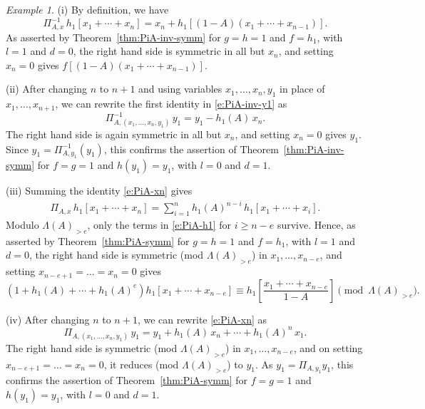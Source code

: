 \documentclass[12pt]{amsart}
\theoremstyle{definition}
\theoremstyle{remark}
\newtheorem{example}[thm]{Example}
\begin{document}
\begin{example}\label{ex:PiA-limits}
(i) By definition, we have
\begin{equation}\label{e:PiA-inv-h1}
\Pi _{A,x}^{-1}\, h_{1}[x_{1}+\cdots +x_{n}] =
x_{n}+h_{1}[(1-A)(x_{1}+\cdots +x_{n-1})].
\end{equation}
As asserted by Theorem~\ref{thm:PiA-inv-symm} for $g=h=1$ and
$f=h_{1}$, with $l=1$ and $d=0$, the right hand side is symmetric in
all but $x_{n}$, and setting $x_{n} = 0$ gives $f[(1-A)(x_{1}+\cdots
+x_{n-1})]$.

(ii) After changing $n$ to $n+1$ and using variables $x_1, \dots, x_n,
y_1$ in place of $x_1,\dots, x_{n+1}$, we can rewrite the first
identity in \eqref{e:PiA-inv-y1} as
\begin{equation}
\Pi _{A,(x_{1},\ldots,x_{n},y_{1})}^{-1}\, y_{1} = y_{1} - h_{1}(A)\,
x_{n}.
\end{equation}
The right hand side is again symmetric in all but $x_{n}$, and setting
$x_{n} = 0$ gives $y_{1}$. Since $y_1=\Pi^{-1}_{A,y_1}(y_1)$, this
confirms the assertion of Theorem~\ref{thm:PiA-inv-symm} for $f = g =
1$ and $h(y_{1})=y_{1}$, with $l=0$ and $d=1$.

(iii) Summing the identity \eqref{e:PiA-xn} gives
\begin{gather}
\label{e:PiA-h1}
\Pi _{A,x}\, h_{1}[x_{1}+\cdots +x_{n}] = \sum _{i=1}^{n}
h_{1}(A)^{n-i}\, h_{1}[x_{1}+\cdots +x_{i}].
\end{gather}
Modulo $\Lambda (A)_{>e}$, only the terms in \eqref{e:PiA-h1} for
$i\geq n-e$ survive.  Hence, as asserted by Theorem~\ref{thm:PiA-symm}
for $g=h=1$ and $f=h_{1}$, with $l=1$ and $d=0$, the right hand side
is symmetric (mod $\Lambda (A)_{>e}$) in $x_{1},\ldots,x_{n-e}$, and
setting $x_{n-e+1} = \ldots =x_{n} = 0$ gives
\begin{equation}\label{e:PiA-h1-reduced}
(1+h_{1}(A)+\cdots +h_{1}(A)^{e}) h_{1}[x_{1}+\cdots +x_{n-e}] \equiv
h_{1}\! \left[\frac{x_{1}+\cdots +x_{n-e}}{1-A}\right] \pmod{\Lambda
(A)_{>e}}.
\end{equation}

(iv) After changing $n$ to $n+1$, we can rewrite \eqref{e:PiA-xn} as
\begin{equation}\label{e:PiA-y1}
\Pi _{A,(x_{1},\ldots,x_{n},y_{1})}\, y_{1} = y_{1} + h_{1}(A)\, x_{n}
+\cdots +h_{1}(A)^{n}\, x_{1}.
\end{equation}
The right hand side is
symmetric (mod $\Lambda (A)_{>e}$) in $x_{1},\ldots,x_{n-e}$, and on
setting $x_{n-e+1} = \ldots =x_{n} = 0$, it reduces (mod $\Lambda
(A)_{>e}$) to $y_{1}$. As $y_1=\Pi_{A,y_1}y_1$, this confirms the assertion of
Theorem~\ref{thm:PiA-symm} for $f = g = 1$ and
$h(y_{1})=y_{1}$, with $l=0$ and $d=1$.
\end{example}
\end{document}
